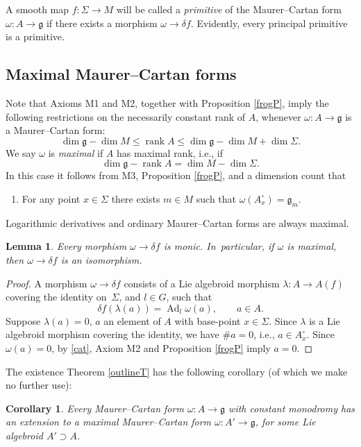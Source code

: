 \documentclass[10pt,a4paper]{amsart}
\numberwithin{equation}{section}
\newtheorem{Corollary}[Theorem]{Corollary}
\newtheorem{Lemma}[Theorem]{Lemma}
\DeclareMathOperator{\rank}{rank} \DeclareMathOperator{\image}{im}
\DeclareMathOperator{\Adjoint}{Ad}
\DeclareMathOperator{\dimension}{dim}
\renewcommand{\le}{\leqslant}
\begin{document}
A smooth map $f \colon \Sigma \rightarrow M$ will be called a {\it primitive} of the Maurer--Cartan form
$\omega \colon A \rightarrow {\mathfrak g} $ if there exists a
morphism $\omega \rightarrow \delta f$. Evidently, every principal
primitive is a primitive.

\subsection*{Maximal Maurer--Cartan forms}%

Note that Axioms M1 and M2, together with Proposition \ref{frogP},
imply the following restrictions on the necessarily constant rank of
$A$, whenever $\omega \colon A \rightarrow {\mathfrak g} $ is a
Maurer--Cartan form:
\begin{equation*}
\dimension {\mathfrak g} -\dimension M\le \rank A
\le \dimension {\mathfrak g} -\dimension M + \dimension \Sigma.
\end{equation*}
We say $\omega $ is {\it maximal} if $A$ has maximal
rank, i.e., if
\[
\dim {\mathfrak g}-\rank A = \dimension M - \dimension \Sigma.
\]
In
this case it follows from M3, Proposition \ref{frogP}, and a dimension
count that
\begin{enumerate}\itemsep=0pt
\item[M3$'$.] For any point $x \in \Sigma $ there exists $m \in M$
such that $\omega(A^\circ_x) = {\mathfrak g}_m$.
\end{enumerate} Logarithmic derivatives and ordinary Maurer--Cartan
forms are always maximal.
%
\begin{Lemma}%
 Every morphism $\omega \rightarrow \delta f$ is monic. In~particular, if $\omega $ is maximal, then
 $\omega \rightarrow \delta f$ is an isomorphism.
\end{Lemma}

\begin{proof} A morphism $\omega \rightarrow \delta f$ consists of a
Lie algebroid morphism $\lambda \colon A \rightarrow A(f)$ covering
the identity on~$\Sigma$, and $l \in G$, such that
 \begin{equation}
 \delta f (\lambda(a))=\Adjoint_l \omega(a), \qquad a \in A.\label{cat}
 \end{equation}
 Suppose $\lambda(a)=0$, $a$ an element of $A $ with
base-point $x \in \Sigma $. Since $\lambda$ is a Lie algebroid
morphism covering the identity, we have $\# a =0$, i.e., $a \in
A^\circ_x$. Since $\omega(a)=0$, by \eqref{cat}, Axiom M2 and
Proposition \ref{frogP} imply $a=0$.
\end{proof}
%
The existence Theorem \ref{outlineT} has the following corollary (of
which we make no further use):
\begin{Corollary}%
 Every Maurer--Cartan form
 $\omega \colon A \rightarrow {\mathfrak g} $ with constant monodromy
 has an extension to a maximal Maurer--Cartan form
 $\omega \colon A' \rightarrow {\mathfrak g} $, for some Lie
 algebroid $A' \supset A$.
\end{Corollary}
\end{document}
